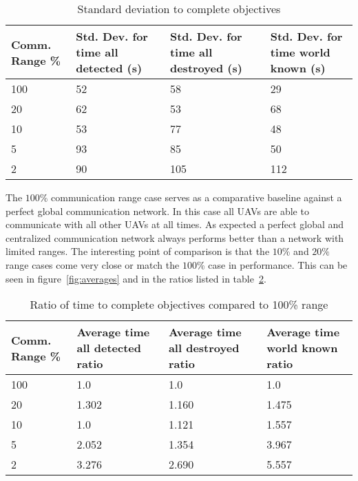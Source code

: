 \begin{table}[H]
	\caption{Standard deviation to complete objectives}
	\centering
	\label{tab:stdDevResults}
	\begin{tabular}{|p{1.25cm}|p{1.5cm}|p{1.75cm}|p{1.5cm}|}
		\hline
		Comm. Range \% & Std. Dev. for time all detected (s) & Std. Dev. for time all destroyed (s) & Std. Dev. for time world known (s)\\
		\hline
		100 & 52 & 58  & 29  \\ \hline
		20  & 62 & 53  & 68  \\ \hline
		10  & 53 & 77  & 48  \\ \hline
		5   & 93 & 85  & 50  \\ \hline
		2   & 90 & 105 & 112 \\ \hline
	\end{tabular}
\end{table}



The $100\%$ communication range case serves as a comparative baseline against a perfect global communication network.  In this case all UAVs are able to communicate with all other UAVs at all times.  As expected a perfect global and centralized communication network always performs better than a network with limited ranges.  The interesting point of comparison is that the $10\%$ and $20\%$ range cases come very close or match the $100\%$ case in performance.  This can be seen in figure~\ref{fig:averages} and in the ratios listed in table~\ref{tab:avgResultsRatio}.

\begin{table}[H]
	\caption{Ratio of time to complete objectives compared to 100\% range}
	\centering
	\label{tab:avgResultsRatio}
	\begin{tabular}{|p{1.25cm}|p{1.5cm}|p{1.75cm}|p{1.5cm}|}
		\hline
		Comm. Range \% & Average time all detected ratio & Average time all destroyed ratio & Average time world known ratio\\
		\hline
		100 & 1.0   & 1.0   & 1.0  \\ \hline
		20  & 1.302 & 1.160 & 1.475  \\ \hline
		10  & 1.0   & 1.121 & 1.557  \\ \hline
		5   & 2.052 & 1.354 & 3.967 \\ \hline
		2   & 3.276 & 2.690 & 5.557 \\ \hline
	\end{tabular}
\end{table}

